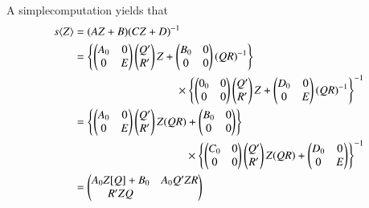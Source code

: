 A simple\pageoriginale  computation yields that
\begin{align*}
s\langle Z \rangle &= (AZ +  B) (CZ + D)^{-1}\\ 
&=\left \{ \begin{pmatrix} A_0 & 0 \\ 0 &
  E \end{pmatrix} \begin{pmatrix}Q' \\ R' \end{pmatrix} Z
+ \begin{pmatrix} B_0 & 0 \\ 0 & 0 \end{pmatrix} (Q
R)^{-1}\right\}\\
& \hspace{3.2cm} \times \left \{ \begin{pmatrix} 0_0 & 0 \\ 0 &
  0 \end{pmatrix}\begin{pmatrix}Q' \\ R' \end{pmatrix} Z
+ \begin{pmatrix} D_0 & 0 \\ 0 & E \end{pmatrix} (Q
R)^{-1}\right\}^{-1}\\ 
&=\left \{ \begin{pmatrix} A_0 & 0 \\ 0 &
  E \end{pmatrix}\begin{pmatrix}Q' \\ R' \end{pmatrix}Z (Q
R)+\begin{pmatrix} B_0 & 0 \\ 0 & 0 \end{pmatrix}\right \}\\
& \hspace{3.5cm} \times \left
\{\begin{pmatrix} C_0 & 0 \\ 0 & 0 \end{pmatrix}\begin{pmatrix}Q'
  \\ R'\end{pmatrix}Z(Q R)+ \begin{pmatrix}D_0 & 0\\ 0 &
    E \end{pmatrix}\right \}^{-1}\\ 
&=\begin{pmatrix}A_0Z[Q]+B_0 & A_0 Q' ZR\\ R'ZQ &

\end{pmatrix}
\end{align*}
